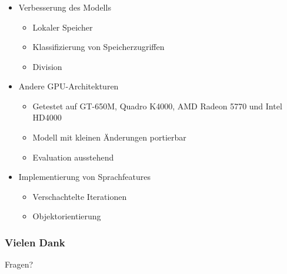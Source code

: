 \documentclass{beamer}
\begin{document}
\begin{frame}
	\frametitle{}
	\begin{itemize}
		\item Verbesserung des Modells
		\begin{itemize}
			\item Lokaler Speicher
			\item Klassifizierung von Speicherzugriffen
			\item Division
		\end{itemize}
		\item Andere GPU-Architekturen
		\begin{itemize}
			\item Getestet auf GT-650M, Quadro K4000, AMD Radeon 5770 und Intel HD4000
			\item Modell mit kleinen Änderungen portierbar
			\item Evaluation ausstehend
		\end{itemize}
		\item Implementierung von Sprachfeatures
		\begin{itemize}
			\item Verschachtelte Iterationen
			\item Objektorientierung
		\end{itemize}
	\end{itemize}
\end{frame}

\begin{frame}
	\frametitle{Vielen Dank}
	\begin{center}
		\begin{Huge}
			Fragen?
		\end{Huge}
	\end{center}
\end{frame}
\end{document}
